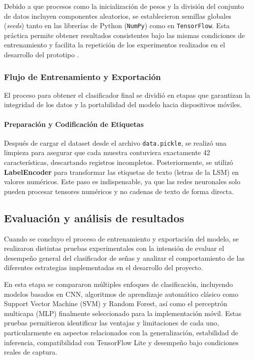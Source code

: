 	Debido a que procesos como la inicialización de pesos y la división del conjunto de datos incluyen componentes aleatorios, se establecieron semillas globales (\textit{seeds}) tanto en las librerías de Python (\texttt{NumPy}) como en \texttt{TensorFlow}. Esta práctica permite obtener resultados consistentes bajo las mismas condiciones de entrenamiento y facilita la repetición de los experimentos realizados en el desarrollo del prototipo \cite{TensorFlow2024}.
	
	\subsubsection{Flujo de Entrenamiento y Exportación}
	
	El proceso para obtener el clasificador final se dividió en etapas que garantizan la integridad de los datos y la portabilidad del modelo hacia dispositivos móviles.
	
	\paragraph{Preparación y Codificación de Etiquetas}
	Después de cargar el dataset desde el archivo \texttt{data.pickle}, se realizó una limpieza para asegurar que cada muestra contuviera exactamente 42 características, descartando registros incompletos. Posteriormente, se utilizó \textbf{LabelEncoder} para transformar las etiquetas de texto (letras de la LSM) en valores numéricos. Este paso es indispensable, ya que las redes neuronales solo pueden procesar tensores numéricos y no cadenas de texto de forma directa.
	
	\subsection{Evaluación y análisis de resultados}
	
	Cuando se concluyo el proceso de entrenamiento y exportación del modelo, se realizaron distintas pruebas experimentales con la intensión de evaluar el desempeño general del clasificador de señas y analizar el comportamiento de las diferentes estrategias implementadas en el desarrollo del proyecto.
	
	En esta etapa se compararon múltiples enfoques de clasificación, incluyendo modelos basados en CNN, algoritmos de aprendizaje automático clásico como Support Vector Machine (SVM) y Random Forest, así como el perceptrón multicapa (MLP) finalmente seleccionado para la implementación móvil. Estas pruebas permitieron identificar las ventajas y limitaciones de cada uno, particularmente en aspectos relacionados con la generalización, estabilidad de inferencia, compatibilidad con TensorFlow Lite y desempeño bajo condiciones reales de captura.
	
